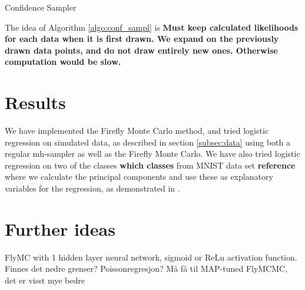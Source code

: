 \documentclass{article}
\theoremstyle{definition}
\begin{document}
\begin{algorithm}[H]
    \caption{Confidence Sampler}
    \label{algo:conf_sampl}
\end{algorithm}
The idea of Algorithm \ref{algo:conf_sampl} is 
\textbf{Must keep calculated likelihoods for each data when it is first drawn. We expand on the previously drawn data points, and do not draw entirely new ones. Otherwise computation would be slow. }

\section*{Results}
We have implemented the Firefly Monte Carlo method, and tried logistic regression on simulated data, as described in section \ref{subsec:data} using both a regular \gls{mh}-sampler as well as the Firefly Monte Carlo. We have also tried logistic regression on two of the classes \textbf{which classes} from MNIST data set \textbf{reference} where we calculate the principal components and use these as explanatory variables for the regression, as demonstrated in \cite{Maclaurin:1}. 
\section*{Further ideas}
FlyMC with 1 hidden layer neural network, sigmoid or ReLu activation function. Finnes det nedre grenser? 
Poissonregresjon?
Må få til MAP-tuned FlyMCMC, det er visst mye bedre
\printbibliography
\end{document}
